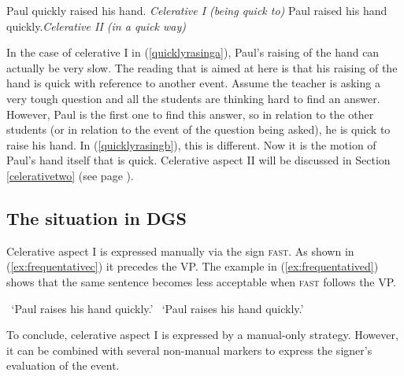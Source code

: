 \begin{exe}
\ex\label{quicklyrasing}\begin{xlist}
\ex Paul quickly raised his hand. \hfill{\textit{Celerative I (\textit{being quick to})}} \label{quicklyrasinga}
\ex Paul raised his hand quickly.\hfill{\textit{Celerative II (\textit{in a quick way})}} \label{quicklyrasingb}
\end{xlist}
\end{exe}  

\noindent In the case of celerative I in (\ref{quicklyrasinga}), Paul's raising of the hand can actually be very slow. The reading that is aimed at here is that his raising of the hand is quick with reference to another event. Assume the teacher is asking a very tough question and all the students are thinking hard to find an answer. However, Paul is the first one to find this answer, so in relation to the other students (or in relation to the event of the question being asked), he is quick to raise his hand. In (\ref{quicklyrasingb}), this is different. Now it is the motion of Paul's hand itself that is quick. Celerative aspect II will be discussed in Section \ref{celerativetwo} (see page \pageref{celerativetwo}).

\subsection{The situation in DGS}

Celerative aspect I is expressed manually via the sign \textsc{fast}. As shown in (\ref{ex:frequentativec}) it precedes the VP. The example in (\ref{ex:frequentatived}) shows that the same sentence becomes less acceptable when \textsc{fast} follows the VP. 

\begin{exe}
\ex\begin{xlist} 
\glt \textcolor{white}{?}`Paul raises his hand quickly.' \label{ex:frequentativec}
\glt \textcolor{white}{?}`Paul raises his hand quickly.'  \label{ex:frequentatived}
\end{xlist}
\end{exe} 

\noindent To conclude, celerative aspect I is expressed by a manual-only strategy. However, it can be combined with several non-manual markers to express the signer's evaluation of the event. 

\vspace{-0.5cm}
